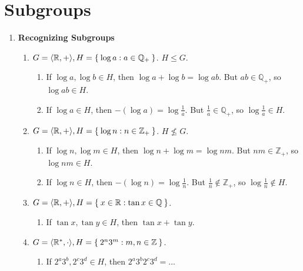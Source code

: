 \chapter{Subgroups}
\label{ch:subgroups}

\begin{enumerate}[label={\Alph*.},font={\bfseries}]
\item {\bf Recognizing Subgroups}
  \begin{enumerate}[label={\arabic*},font={\bfseries}]
  \item $G = \langle\mathbb{R}, +\rangle, H = \Set{\log a : a \in \mathbb{Q}_{+}}$.
    $H \le G$.
    \begin{enumerate}[label={(\roman*)}]
    \item If $\log a, \log b \in H$, then $\log a + \log b = \log ab$. But $ab \in \mathbb{Q}_{+}$, so $\log ab \in H$.
    \item If $\log a \in H$, then $-(\log a) = \log \frac{1}{a}$. But $\frac{1}{a} \in \mathbb{Q}_{+}$, so $\log \frac{1}{a} \in H$.
    \end{enumerate}
  \item $G = \langle\mathbb{R}, +\rangle, H = \Set{\log n : n \in \mathbb{Z}_{+}}$.
    $H \not\le G$.
    \begin{enumerate}[label={(\roman*)}]
    \item If $\log n, \log m \in H$, then $\log n + \log m = \log nm$. But $nm \in \mathbb{Z}_{+}$, so $\log nm \in H$.
    \item If $\log n \in H$, then $-(\log n) = \log \frac{1}{n}$. But $\frac{1}{n} \not\in \mathbb{Z}_{+}$, so $\log \frac{1}{n} \not\in H$.
    \end{enumerate}
  \item $G = \langle\mathbb{R}, +\rangle, H = \Set{x \in \mathbb{R} : \tan x \in \mathbb{Q}}$.
    \begin{enumerate}[label={(\roman*)}]
    \item If $\tan x, \tan y \in H$, then $\tan x + \tan y$. 
    \end{enumerate}
  \item $G = \langle\mathbb{R}^{*}, \cdot\rangle, H = \Set{2^n3^m : m,n \in \mathbb{Z}}$.
    \begin{enumerate}[label={(\roman*)}]
    \item If $2^a3^b, 2^c3^d \in H$, then $2^a3^b2^c3^d = ...$ 
    \end{enumerate}

\end{enumerate}
\end{enumerate}
